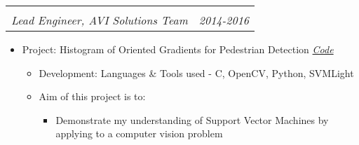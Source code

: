 \documentclass[letterpaper,11pt]{article}
\makeatletter
\def\CC{{C\nolinebreak[4]\hspace{-.05em}\raisebox{.4ex}{\tiny\bf ++}}}
\newcommand{\resitem}[1]{\item #1 \vspace{-2pt}}
\newcommand{\ressubheading}[4]{
	\begin{tabular*}{7.0in}{l@{\extracolsep{\fill}}r}
		\textbf{#1} & #2 \\
		\textit{#3} & \textit{#4} \\
	\end{tabular*}\vspace{-6pt}}
\makeatother
\begin{document}
\begin{itemize}
\begin{itemize}
\begin{itemize}
\begin{itemize}
						\end{itemize}
				\end{itemize}
		\end{itemize}
		\ressubheading{}{}{Lead Engineer, AVI Solutions Team}{2014-2016}
		\vspace{1mm}
		\begin{itemize}
				\resitem[]{\faCircleO \hspace{1mm}Project: Histogram of Oriented Gradients for Pedestrian Detection
					\faGithub \hspace{1mm} \href{https://github.com/nrupatunga/Pedestrain-Detection-using-Histogram-of-Oriented-Gradients}{\emph{Code}}}
				\begin{itemize}
						\resitem{Development: Languages \& Tools used - \CC, OpenCV, Python, SVMLight}
				\end{itemize}
				\begin{itemize}
						\resitem{Aim of this project is to:}
						\begin{itemize}
								\resitem{Demonstrate my understanding of Support Vector Machines by applying to a computer vision problem}
						\end{itemize}
				\end{itemize}


\end{itemize}
\end{itemize}
\end{document}
